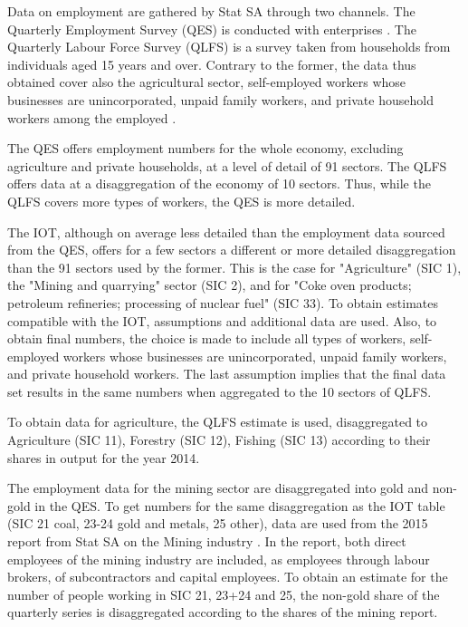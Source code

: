 \documentclass[12pt,english]{article}
\newcommand\lies[2][]{\todo[color=orange!50,#1]{ldf: #2}}
\begin{document}
Data on employment are gathered by Stat SA through two channels. The Quarterly Employment Survey (QES) is conducted with enterprises \citep{QES2018}. The Quarterly Labour Force Survey (QLFS) is a survey taken from households from individuals aged 15 years and over. Contrary to the former, the data thus obtained cover also the agricultural sector, self-employed workers whose businesses are unincorporated, unpaid family workers, and private household workers among the employed \citep{QLFS2018}.

The QES offers employment numbers for the whole economy, excluding agriculture and private households, at a level of detail of 91 sectors. The QLFS offers data at a disaggregation of the economy of 10 sectors. Thus, while the QLFS covers more types of workers, the QES is more detailed.

The IOT, although on average less detailed than the employment data sourced from the QES, offers for a few sectors a different or more detailed disaggregation than the 91 sectors used by the former. This is the case for "Agriculture" (SIC 1), the "Mining and quarrying" sector (SIC 2), and for "Coke oven products; petroleum refineries; processing of nuclear fuel" (SIC 33). To obtain estimates compatible with the IOT, assumptions and additional data are used. Also, to obtain final numbers, the choice is made to include all types of workers, self-employed workers whose businesses are unincorporated, unpaid family workers, and private household workers. The last assumption implies that the final data set results in the same numbers when aggregated to the 10 sectors of QLFS. 

To obtain data for agriculture, the QLFS estimate is used, disaggregated to Agriculture (SIC 11), Forestry (SIC 12), Fishing (SIC 13) according to their shares in output for the year 2014. 

The employment data for the mining sector are disaggregated into gold and non-gold in the QES. To get numbers for the same disaggregation as the IOT table (SIC 21 coal, 23-24 gold and metals, 25 other), data are used from the 2015 report from Stat SA on the Mining industry \citep{mining2015}. In the report, both direct employees of the mining industry are included, as employees through labour brokers, of subcontractors and capital employees\lies{what are those?}.%
To obtain an estimate for the number of people working in SIC 21, 23+24 and 25, the non-gold share of the quarterly series is disaggregated according to the shares of the mining report. 
\end{document}
